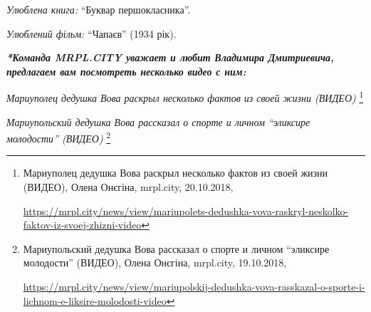 \emph{Улюблена книга:} \enquote{Буквар першокласника}.\par
\bigskip
\emph{Улюблений фільм:} \enquote{Чапаєв} (1934 рік).\par
\bigskip

\textbf{\emph{*Команда MRPL.CITY уважает и любит Владимира Дмитриевича, предлагаем вам посмотреть несколько видео с ним:}}\par
\bigskip

\emph{Мариуполец дедушка Вова раскрыл несколько фактов из своей жизни (ВИДЕО)}%
\footnote{Мариуполец дедушка Вова раскрыл несколько фактов из своей жизни (ВИДЕО), Олена Онєгіна, mrpl.city, 20.10.2018, \par%
\url{https://mrpl.city/news/view/mariupolets-dedushka-vova-raskryl-neskolko-faktov-iz-svoej-zhizni-video}
}

\emph{Мариупольский дедушка Вова рассказал о спорте и личном \enquote{эликсире молодости} (ВИДЕО)}%
\footnote{Мариупольский дедушка Вова рассказал о спорте и личном \enquote{эликсире молодости} (ВИДЕО), Олена Онєгіна, %
mrpl.city, 19.10.2018, \par%
\url{https://mrpl.city/news/view/mariupolskij-dedushka-vova-rasskazal-o-sporte-i-lichnom-e-liksire-molodosti-video}
}
